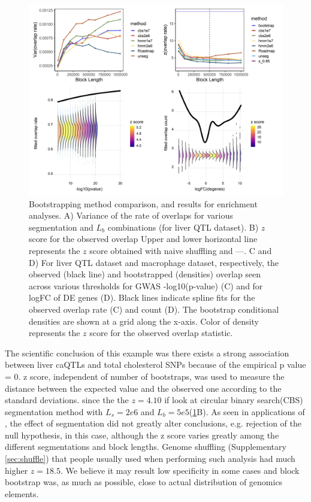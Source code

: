 \begin{figure}[hbtp]
\centering%
\setlength{\abovecaptionskip}{-0.1cm}
\setlength{\belowcaptionskip}{-0.1cm}
\includegraphics[scale=0.25]{Figures/fig2.jpeg}
\caption{
  Bootstrapping method comparison, and results for enrichment
  analyses. 
  A) Variance of the rate of overlaps
  for various segmentation and $L_b$ combinations (for liver QTL dataset).
  B) $z$ score for the observed overlap
  Upper and lower horizontal line represents the $z$ score obtained
  with naive shuffling and ---.
  C and D) For liver QTL dataset and macrophage dataset, respectively,
  the observed (black line) and bootstrapped (densities) overlap
  seen across various thresholds for GWAS -log10(p-value) (C) and for
  logFC of DE genes (D). Black lines indicate spline fits for the
  observed overlap rate (C) and count (D). The bootstrap conditional
  densities are shown at a grid along the x-axis. Color of density
  represents the $z$ score for the observed overlap statistic.}
\label{fig:result}
\end{figure}

The scientific conclusion of this example was there exists a strong
association between liver caQTLs and total cholesterol SNPs because of
the empirical p value = 0. z score, independent of number of
bootstraps, was used to measure the distance between the expected
value and the observed one according to the standard deviations.
since the the $z = 4.10$ if look at circular binary search(CBS)
\citep{cbs} segmentation method with $L_s = 2e6$ and
$L_b=5e5$(\cref{fig:result}B).  As seen in applications of
\citet{bickel2010subsampling}, the effect of segmentation did not
greatly alter conclusions, e.g. rejection of the null hypothesis, in
this case, although the z score varies greatly among the different
segmentations and block lengths.  Genome shuffling (Supplementary
\cref{sec:shuffle}) that people usually used when performing such
analysis had much higher $z = 18.5$. We believe it may result low
specificity in some cases and block bootstrap was, as much as
possible, close to actual distribution of genomics elements.

